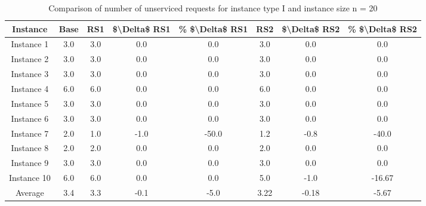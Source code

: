 \begin{table}[H]
\centering
\begin{tabular}{cccccccc}
  \hline
  \textbf{Instance} & \textbf{Base} & \textbf{RS1} & \textbf{\$\textbackslash{}Delta\$  RS1} & \textbf{\% \$\textbackslash{}Delta\$  RS1} & \textbf{RS2} & \textbf{\$\textbackslash{}Delta\$  RS2} & \textbf{\% \$\textbackslash{}Delta\$  RS2} \\\hline
  Instance 1 & 3.0 & 3.0 & 0.0 & 0.0 & 3.0 & 0.0 & 0.0 \\
  Instance 2 & 3.0 & 3.0 & 0.0 & 0.0 & 3.0 & 0.0 & 0.0 \\
  Instance 3 & 3.0 & 3.0 & 0.0 & 0.0 & 3.0 & 0.0 & 0.0 \\
  Instance 4 & 6.0 & 6.0 & 0.0 & 0.0 & 6.0 & 0.0 & 0.0 \\
  Instance 5 & 3.0 & 3.0 & 0.0 & 0.0 & 3.0 & 0.0 & 0.0 \\
  Instance 6 & 3.0 & 3.0 & 0.0 & 0.0 & 3.0 & 0.0 & 0.0 \\
  Instance 7 & 2.0 & 1.0 & -1.0 & -50.0 & 1.2 & -0.8 & -40.0 \\
  Instance 8 & 2.0 & 2.0 & 0.0 & 0.0 & 2.0 & 0.0 & 0.0 \\
  Instance 9 & 3.0 & 3.0 & 0.0 & 0.0 & 3.0 & 0.0 & 0.0 \\
  Instance 10 & 6.0 & 6.0 & 0.0 & 0.0 & 5.0 & -1.0 & -16.67 \\
  Average & 3.4 & 3.3 & -0.1 & -5.0 & 3.22 & -0.18 & -5.67 \\\hline
\end{tabular}
\caption{Comparison of number of unserviced requests for instance type I and instance size n = 20}
\label{tab:wait:resrelocation-nTaxi-comparison_I_20}
\end{table}
